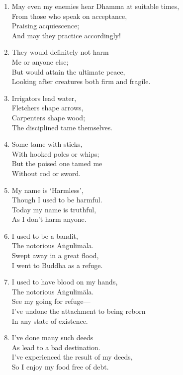 \documentclass[10pt, openany]{book}
\begin{document}
\begin{enumerate}
\item May even my enemies hear Dhamma at suitable times,\\
From those who speak on acceptance,\\
Praising acquiescence;\\
And may they practice accordingly!

\item They would definitely not harm\\
Me or anyone else;\\
But would attain the ultimate peace,\\
Looking after creatures both firm and fragile.

\item Irrigators lead water,\\
Fletchers shape arrows,\\
Carpenters shape wood;\\
The disciplined tame themselves.

\item Some tame with sticks,\\
With hooked poles or whips;\\
But the poised one tamed me\\
Without rod or sword.

\item My name is ‘Harmless’,\\
Though I used to be harmful.\\
Today my name is truthful,\\
As I don’t harm anyone.

\item I used to be a bandit,\\
The notorious Aṅgulimāla.\\
Swept away in a great flood,\\
I went to Buddha as a refuge.

\item I used to have blood on my hands,\\
The notorious Aṅgulimāla.\\
See my going for refuge—\\
I’ve undone the attachment to being reborn \\
In any state of existence.

\item I’ve done many such deeds\\
As lead to a bad destination.\\
I’ve experienced the result of my deeds,\\
So I enjoy my food free of debt.


\end{enumerate}
\end{document}
